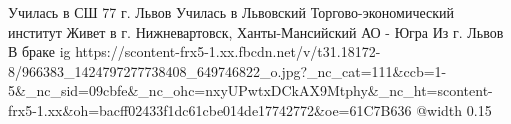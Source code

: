  
 
 
 
 

\par
Училась в СШ 77 г. Львов
Училась в Львовский Торгово-экономический институт
Живет в г. Нижневартовск, Ханты-Мансийский АО - Югра
Из г. Львов
В браке
\ifcmt
  ig https://scontent-frx5-1.xx.fbcdn.net/v/t31.18172-8/966383_1424797277738408_649746822_o.jpg?_nc_cat=111&ccb=1-5&_nc_sid=09cbfe&_nc_ohc=nxyUPwtxDCkAX9Mtphy&_nc_ht=scontent-frx5-1.xx&oh=bacff02433f1dc61cbe014de17742772&oe=61C7B636
  @width 0.15
\fi


